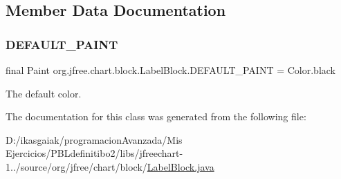 \subsection{Member Data Documentation}
\mbox{\label{classorg_1_1jfree_1_1chart_1_1block_1_1_label_block_a21c6a91d4806cb57de4864b7a6572572}} 
\subsubsection{\texorpdfstring{D\+E\+F\+A\+U\+L\+T\+\_\+\+P\+A\+I\+NT}{DEFAULT\_PAINT}}
{\footnotesize\ttfamily final Paint org.\+jfree.\+chart.\+block.\+Label\+Block.\+D\+E\+F\+A\+U\+L\+T\+\_\+\+P\+A\+I\+NT = Color.\+black\hspace{0.3cm}{\ttfamily [static]}}

The default color. 

The documentation for this class was generated from the following file\+:\begin{DoxyCompactItemize}
\item 
D\+:/ikasgaiak/programacion\+Avanzada/\+Mis Ejercicios/\+P\+B\+Ldefinitibo2/libs/jfreechart-\/1../source/org/jfree/chart/block/\mbox{\hyperlink{_label_block_8java}{Label\+Block.\+java}}\end{DoxyCompactItemize}
